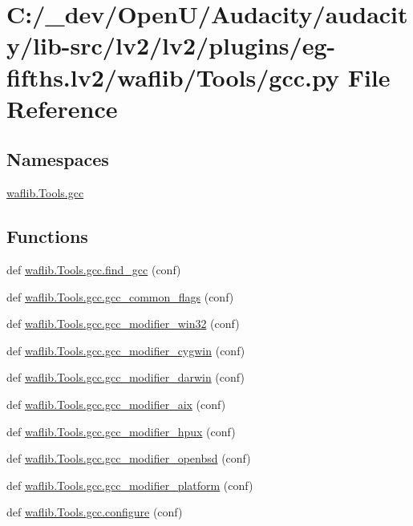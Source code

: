 \hypertarget{lv2_2plugins_2eg-fifths_8lv2_2waflib_2_tools_2gcc_8py}{}\section{C\+:/\+\_\+dev/\+Open\+U/\+Audacity/audacity/lib-\/src/lv2/lv2/plugins/eg-\/fifths.lv2/waflib/\+Tools/gcc.py File Reference}
\label{lv2_2plugins_2eg-fifths_8lv2_2waflib_2_tools_2gcc_8py}
\subsection*{Namespaces}
\begin{DoxyCompactItemize}
\item 
 \hyperlink{namespacewaflib_1_1_tools_1_1gcc}{waflib.\+Tools.\+gcc}
\end{DoxyCompactItemize}
\subsection*{Functions}
\begin{DoxyCompactItemize}
\item 
def \hyperlink{namespacewaflib_1_1_tools_1_1gcc_adf21017012efdee616642ded5bb60683}{waflib.\+Tools.\+gcc.\+find\+\_\+gcc} (conf)
\item 
def \hyperlink{namespacewaflib_1_1_tools_1_1gcc_aa246ce31be40dc13e4667dccc88c659c}{waflib.\+Tools.\+gcc.\+gcc\+\_\+common\+\_\+flags} (conf)
\item 
def \hyperlink{namespacewaflib_1_1_tools_1_1gcc_ae9e66bb9518233bc92bb4dba88559396}{waflib.\+Tools.\+gcc.\+gcc\+\_\+modifier\+\_\+win32} (conf)
\item 
def \hyperlink{namespacewaflib_1_1_tools_1_1gcc_a5a86b1286220845f0499fde5bfd3276d}{waflib.\+Tools.\+gcc.\+gcc\+\_\+modifier\+\_\+cygwin} (conf)
\item 
def \hyperlink{namespacewaflib_1_1_tools_1_1gcc_a1bd8f384e014d4230087830a15403045}{waflib.\+Tools.\+gcc.\+gcc\+\_\+modifier\+\_\+darwin} (conf)
\item 
def \hyperlink{namespacewaflib_1_1_tools_1_1gcc_aaa265ca0c341d3de2b08c63f42ae800b}{waflib.\+Tools.\+gcc.\+gcc\+\_\+modifier\+\_\+aix} (conf)
\item 
def \hyperlink{namespacewaflib_1_1_tools_1_1gcc_aa4d75e5242d8ccd3cf9953b2ac22b0c2}{waflib.\+Tools.\+gcc.\+gcc\+\_\+modifier\+\_\+hpux} (conf)
\item 
def \hyperlink{namespacewaflib_1_1_tools_1_1gcc_a8dadf5c5d5221a13562c2fa8dab9a5cc}{waflib.\+Tools.\+gcc.\+gcc\+\_\+modifier\+\_\+openbsd} (conf)
\item 
def \hyperlink{namespacewaflib_1_1_tools_1_1gcc_a8b495579108d27d3a2ba7efe6fb32489}{waflib.\+Tools.\+gcc.\+gcc\+\_\+modifier\+\_\+platform} (conf)
\item 
def \hyperlink{namespacewaflib_1_1_tools_1_1gcc_abbff880dc3450c1e8e3ecebbd8eebbad}{waflib.\+Tools.\+gcc.\+configure} (conf)
\end{DoxyCompactItemize}
